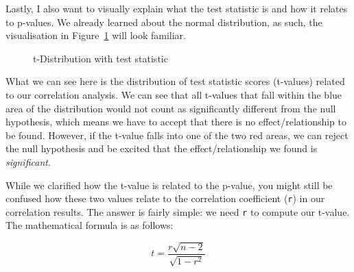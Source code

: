 \documentclass[
  letterpaper,
]{krantz}
\begin{document}
Lastly, I also want to visually explain what the test statistic is and
how it relates to p-values. We already learned about the normal
distribution, as such, the visualisation in
Figure~\ref{fig-null-hypothesis-testing-plot} will look familiar.

\begin{figure}


\caption{\label{fig-null-hypothesis-testing-plot}t-Distribution with
test statistic}

\end{figure}%

What we can see here is the distribution of test statistic scores
(t-values) related to our correlation analysis. We can see that all
t-values that fall within the blue area of the distribution would not
count as significantly different from the null hypothesis, which means
we have to accept that there is no effect/relationship to be found.
However, if the t-value falls into one of the two red areas, we can
reject the null hypothesis and be excited that the effect/relationship
we found is \emph{significant}.

While we clarified how the t-value is related to the p-value, you might
still be confused how these two values relate to the correlation
coefficient (\texttt{r}) in our correlation results. The answer is
fairly simple: we need \texttt{r} to compute our t-value. The
mathematical formula is as follows:

\[
t = \frac{r \sqrt{n - 2}}{\sqrt{1 - r^2}}
\]
\end{document}
